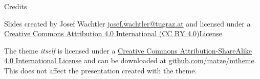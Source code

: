 \documentclass{beamer}
\begin{document}
\begin{frame}{Credits}

  Slides created by Josef Wachtler 
  \href{mailto:josef.wachtler@tugraz.at}{josef.wachtler@tugraz.at} 
  and licensed under a
  \href{http://creativecommons.org/licenses/by/4.0/}{Creative Commons
        Attribution 4.0 International (CC BY 4.0)License} 
  
  \begin{center}
    \begin{huge}
      \ccby
    \end{huge}
  \end{center}

  \begin{tiny}
    The theme \emph{itself} is licensed under a
    \href{http://creativecommons.org/licenses/by-sa/4.0/}{Creative Commons
    Attribution-ShareAlike 4.0 International License}
    and can be downloaded at 
    \href{https://github.com/matze/mtheme}{github.com/matze/mtheme}.
    This does not affect the presentation created with the theme.
  \end{tiny}

\end{frame}

\end{document}

